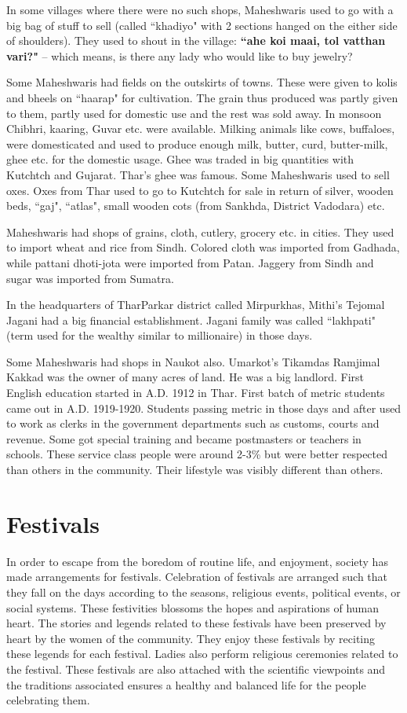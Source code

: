 In some villages where there were no such shops, Maheshwaris used to go with a
big bag of stuff to sell (called ``khadiyo" with 2 sections hanged on the either
side of shoulders). They used to shout in the village: \textbf{``ahe koi maai,
tol vatthan vari?"} -- which means, is there any lady who would like to buy
jewelry?

Some Maheshwaris had fields on the outskirts of towns. These were given to
kolis and bheels on ``haarap" for cultivation. The grain thus produced was
partly given to them, partly used for domestic use and the rest was sold away.
In monsoon Chibhri, kaaring, Guvar etc. were available. Milking animals like
cows, buffaloes, were domesticated and used to produce enough milk, butter,
curd, butter-milk, ghee etc. for the domestic usage. Ghee was traded in big
quantities with Kutchtch and Gujarat. Thar's ghee was famous. Some Maheshwaris
used to sell oxes. Oxes from Thar used to go to Kutchtch for sale in return of
silver, wooden beds, ``gaj", ``atlas", small wooden cots (from Sankhda, District
Vadodara) etc.

Maheshwaris had shops of grains, cloth, cutlery, grocery etc. in cities.
They used to import wheat and rice from Sindh. Colored cloth was imported from
Gadhada, while pattani dhoti-jota were imported from Patan. Jaggery from Sindh
and sugar was imported from Sumatra.

In the headquarters of TharParkar district called Mirpurkhas, Mithi's Tejomal
Jagani had a big financial establishment. Jagani family was called ``lakhpati"
(term used for the wealthy similar to millionaire) in those days.

Some Maheshwaris had shops in Naukot also. Umarkot's Tikamdas Ramjimal Kakkad
was the owner of many acres of land. He was a big landlord. First English
education started in A.D. 1912 in Thar. First batch of metric students came out
in A.D. 1919-1920. Students passing metric  in those days and after used to
work as clerks in the government departments such as customs, courts and
revenue. Some got special training and became postmasters or teachers in
schools. These service class people were around 2-3\% but were better respected
than others in the community. Their lifestyle was visibly different than
others.  \section{Festivals} In order to escape from the boredom of routine
life, and enjoyment,  society has made arrangements for festivals. Celebration
of festivals are arranged such that they fall on the days according to the
seasons, religious events, political events, or social systems. These
festivities blossoms the hopes and aspirations of human heart. The stories and
legends related to these festivals have been preserved by heart by the women of
the community. They enjoy these festivals by reciting these legends for each
festival. Ladies also perform religious ceremonies related to the festival.
These festivals are also attached with the scientific viewpoints and the
traditions associated ensures a healthy and balanced life for the people
celebrating them. 

